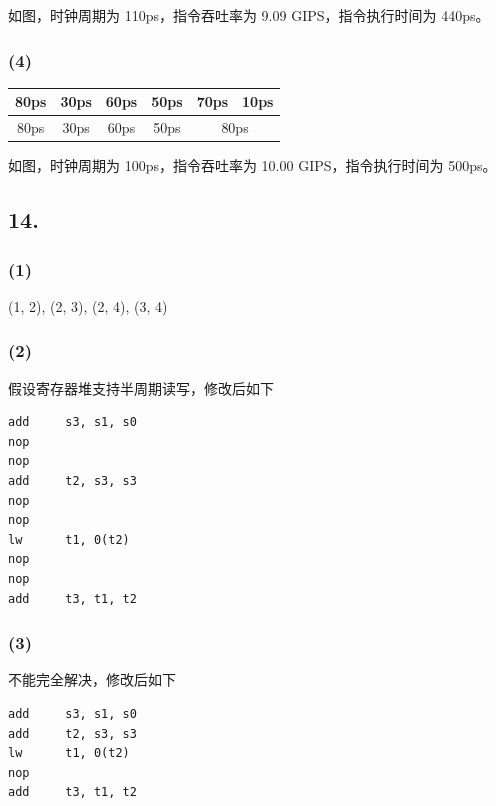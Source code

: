 \documentclass[12pt, a4paper]{ctexart}
\begin{document}
如图，时钟周期为 110ps，指令吞吐率为 9.09 GIPS，指令执行时间为 440ps。

\subsubsection*{(4)}

\begin{table}[H]
    \centering
    \begin{tabular}{|c|c|c|c|cc|}
        \hline
        80ps & 30ps & 60ps & 50ps & 70ps & 10ps \\ \hline
        \multicolumn{1}{|c|}{80ps} & \multicolumn{1}{|c|}{30ps} &
        \multicolumn{1}{|c|}{60ps} & \multicolumn{1}{|c|}{50ps} &
        \multicolumn{2}{|c|}{80ps} \\ \hline
    \end{tabular}
\end{table}

如图，时钟周期为 100ps，指令吞吐率为 10.00 GIPS，指令执行时间为 500ps。

\subsection*{14.}

\subsubsection*{(1)}

(1, 2), (2, 3), (2, 4), (3, 4)

\subsubsection*{(2)}

假设寄存器堆支持半周期读写，修改后如下

\begin{lstlisting}[language={[RISC-V]Assembler}]
add     s3, s1, s0
nop
nop
add     t2, s3, s3
nop
nop
lw      t1, 0(t2)
nop
nop
add     t3, t1, t2
\end{lstlisting}

\subsubsection*{(3)}

不能完全解决，修改后如下

\begin{lstlisting}[language={[RISC-V]Assembler}]
add     s3, s1, s0
add     t2, s3, s3
lw      t1, 0(t2)
nop
add     t3, t1, t2
\end{lstlisting}
\end{document}

